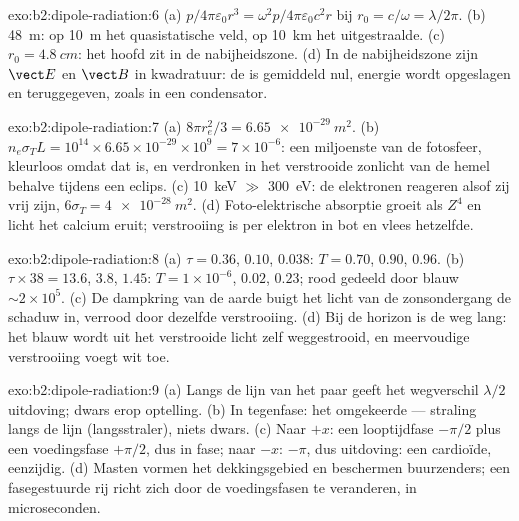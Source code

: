 \begin{solution}{exo:b2:dipole-radiation:6}
(a) $p/4\pi\varepsilon_0r^3 = \omega^2p/4\pi\varepsilon_0c^2r$ bij
$r_0 = c/\omega = \lambda/2\pi$. (b) \qty{48}{m}: op \qty{10}{m} het
quasistatische veld, op \qty{10}{km} het uitgestraalde. (c)
$r_0 = \qty{4.8}{cm}$: het hoofd zit in de nabijheidszone. (d) In de
nabijheidszone zijn $\vect E$ en $\vect B$ in kwadratuur: de 
is gemiddeld nul, energie wordt opgeslagen en teruggegeven, zoals in een
condensator.
\end{solution}

\begin{solution}{exo:b2:dipole-radiation:7}
(a) $8\pi r_e^2/3 = \qty{6.65e-29}{m^2}$. (b)
$n_e\sigma_TL = 10^{14} \times 6.65 \times 10^{-29}
\times 10^9 = 7 \times 10^{-6}$:
een miljoenste van de fotosfeer, kleurloos omdat  dat is,
en verdronken in het verstrooide zonlicht van de hemel behalve tijdens een
eclips. (c) \qty{10}{keV} $\gg$ \qty{300}{eV}: de elektronen reageren alsof
zij vrij zijn, $6\sigma_T = \qty{4e-28}{m^2}$. (d) Foto-elektrische
absorptie groeit als $Z^4$ en licht het calcium eruit; verstrooiing is per
elektron in bot en vlees hetzelfde.
\end{solution}

\begin{solution}{exo:b2:dipole-radiation:8}
(a) $\tau = 0.36$, $0.10$, $0.038$: $T = 0.70$, $0.90$, $0.96$. (b)
$\tau \times 38 = 13.6$, $3.8$, $1.45$: $T = 1 \times 10^{-6}$, $0.02$,
$0.23$; rood gedeeld door blauw $\sim 2 \times 10^5$. (c) De dampkring van
de aarde buigt het licht van de zonsondergang de schaduw in, verrood door
dezelfde verstrooiing. (d) Bij de horizon is de weg lang: het blauw wordt
uit het verstrooide licht zelf weggestrooid, en meervoudige verstrooiing
voegt wit toe.
\end{solution}

\begin{solution}{exo:b2:dipole-radiation:9}
(a) Langs de lijn van het paar geeft het wegverschil $\lambda/2$ uitdoving;
dwars erop optelling. (b) In tegenfase: het omgekeerde --- straling langs de
lijn (langsstraler), niets dwars. (c) Naar $+x$: een looptijdfase $-\pi/2$
plus een voedingsfase $+\pi/2$, dus in fase; naar $-x$: $-\pi$, dus
uitdoving: een cardioïde, eenzijdig. (d) Masten vormen het dekkingsgebied en
beschermen buurzenders; een fasegestuurde rij richt zich door de
voedingsfasen te veranderen, in microseconden.
\end{solution}

